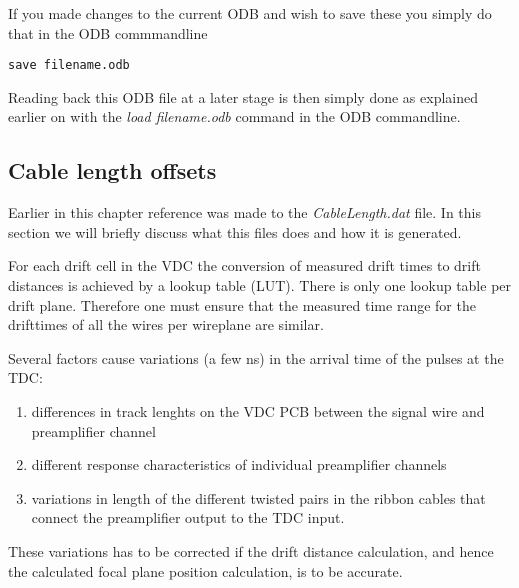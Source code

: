 \documentclass[11pt]{report}
\begin{document}
If you made changes to the current ODB and wish to save these you simply do that in the ODB commmandline
\begin{verbatim} 
save filename.odb
\end{verbatim} 
Reading back this ODB file at a later stage is then simply done as explained earlier on with the 
{\it load filename.odb} command in the ODB commandline.



\subsection{Cable length offsets}\label{sec:CableOffsets}

Earlier in this chapter reference was made to the {\it CableLength.dat} file.
In this section we will briefly discuss what this files does and how it is generated.

For each drift cell in the VDC the conversion of measured drift times to drift distances
is achieved by a lookup table (LUT). There is only one lookup table per drift plane. Therefore
one must ensure that the measured time range for the drifttimes of all the wires
per wireplane are similar.


Several factors cause variations (a few ns) in the arrival time of the pulses at the TDC:
\begin{enumerate}
\item differences in track lenghts on the VDC PCB between the signal wire and preamplifier channel
\item different response characteristics of individual preamplifier channels
\item variations in length of the different twisted pairs in the ribbon cables that connect the 
preamplifier output to the TDC input.
\end{enumerate}
These variations has to be corrected if the drift distance calculation, 
and hence the calculated focal plane position calculation, is to be accurate.
\end{document}
